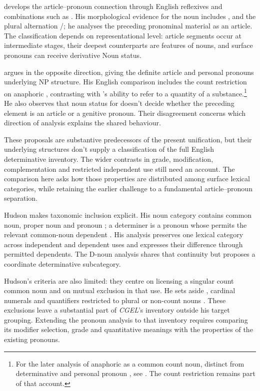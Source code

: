 \documentclass[12pt]{article}
\begin{document}
\textcite{postal1966} develops the article--pronoun connection through English reflexives and combinations such as . His morphological evidence for the noun  includes ,  and the plural alternation /; he analyses the preceding pronominal material as an article. The classification depends on representational level: article segments occur at intermediate stages, their deepest counterparts are features of nouns, and surface pronouns can receive derivative Noun status.

\textcite[197--203]{sommerstein1972} argues in the opposite direction, giving the definite article and personal pronouns underlying NP structure. His English comparison includes the count restriction on anaphoric , contrasting with 's ability to refer to a quantity of a substance.\footnote{For the later analysis of anaphoric  as a common count noun, distinct from determinative  and personal pronoun , see \textcite[797--798]{payne2013anaphoric}. The count restriction remains part of that account.} He also observes that noun status for  doesn't decide whether the preceding element is an article or a genitive pronoun. Their disagreement concerns which direction of analysis explains the shared behaviour.

These proposals are substantive predecessors of the present unification, but their underlying structures don't supply a classification of the full English determinative inventory. The wider contrasts in grade, modification, complementation and restricted independent use still need an account. The comparison here asks how those properties are distributed among surface lexical categories, while retaining the earlier challenge to a fundamental article--pronoun separation.

Hudson makes taxonomic inclusion explicit. His noun category contains common noun, proper noun and pronoun \citep[253--254]{hudson2010wordgrammar}; a determiner is a pronoun whose  permits the relevant common-noun dependent \citep[9--10]{hudson2004determiners}. His analysis preserves one lexical category across independent and dependent uses and expresses their difference through permitted dependents. The D-noun analysis shares that continuity but proposes a coordinate determinative subcategory.

Hudson's criteria are also limited: they centre on licensing a singular count common noun and on mutual exclusion in that use. He sets aside , cardinal numerals and quantifiers restricted to plural or non-count nouns \citep[9--10]{hudson2004determiners}. These exclusions leave a substantial part of \textit{CGEL}'s inventory outside his target grouping. Extending the pronoun analysis to that inventory requires comparing its modifier selection, grade and quantitative meanings with the properties of the existing pronouns.
\end{document}
